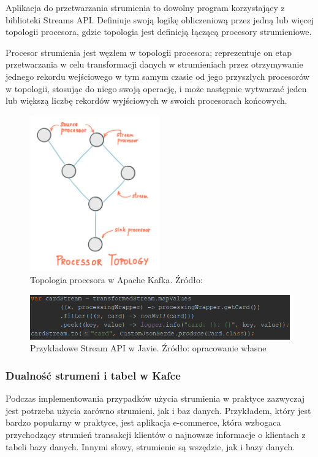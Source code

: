 Aplikacja do przetwarzania strumienia to dowolny program korzystający z biblioteki Streams API. 
Definiuje swoją logikę obliczeniową przez jedną lub więcej topologii procesora, gdzie topologia jest definicją łączącą procesory strumieniowe.

Procesor strumienia jest węzłem w topologii procesora; reprezentuje on etap przetwarzania w celu transformacji danych w strumieniach przez otrzymywanie jednego rekordu wejściowego w tym samym czasie od jego przyszłych procesorów w topologii, stosując do niego swoją operację, i może następnie wytwarzać jeden lub większą liczbę rekordów wyjściowych w swoich procesorach końcowych.\cite{Streams}

\begin{figure}[h!]
  \centering
    \includegraphics[width=0.5\textwidth]{images/streams.jpg}
  \caption{Topologia procesora w Apache Kafka. Źródło: \cite{Streams}}
\end{figure}
\FloatBarrier

\begin{figure}[h!]
  \centering
    \includegraphics[width=1.0\textwidth]{images/streamexample.PNG}
  \caption{Przykładowe Stream API w Javie. Źródło: opracowanie własne}
\end{figure}
\FloatBarrier


\subsubsection{Dualność strumeni i tabel w Kafce}
Podczas implementowania przypadków użycia strumienia w praktyce zazwyczaj jest potrzeba użycia zarówno strumieni, jak i baz danych. Przykładem, który jest bardzo popularny w praktyce, jest aplikacja e-commerce, która wzbogaca przychodzący strumień transakcji klientów o najnowsze informacje o klientach z tabeli bazy danych. Innymi słowy, strumienie są wszędzie, jak i bazy danych.

